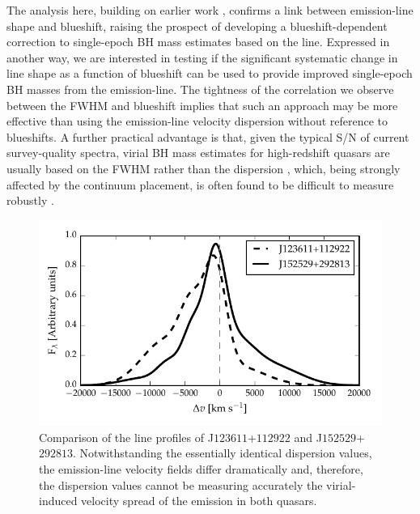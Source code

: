 The analysis here, building on earlier work \citep[including][]{sulentic07,shen12}, confirms a link between  emission-line shape and blueshift, raising the prospect of developing a blueshift-dependent correction to single-epoch BH mass estimates based on the  line.
Expressed in another way, we are interested in testing if the significant systematic change in line shape as a function of  blueshift can be used to provide improved single-epoch BH masses from the  emission-line.
The tightness of the correlation we observe between the  FWHM and blueshift implies that such an approach may be more effective than using the  emission-line velocity dispersion without reference to blueshifts.
A further practical advantage is that, given the typical S/N of current survey-quality spectra, virial BH mass estimates for high-redshift quasars are usually based on the FWHM rather than the dispersion \citep[e.g.][]{shen11}, which, being strongly affected by the continuum placement, is often found to be difficult to measure robustly \citep[e.g.][]{mejia-restrepo16}.

\begin{figure}
    \centering
    \includegraphics[width=\linewidth]{figures/chapter03/civ_comparison.pdf}
    \caption[{Comparison of the  line profiles of J$123611$+$112922$ and J$152529$+$292813$.}]{Comparison of the  line profiles of J$123611$+$112922$ and J$152529$+$292813$. Notwithstanding the essentially identical dispersion values, the emission-line velocity fields differ dramatically and, therefore, the dispersion values cannot be measuring accurately the virial-induced velocity spread of the  emission in both quasars. }
    \label{fig:civ_comparison}
\end{figure}

